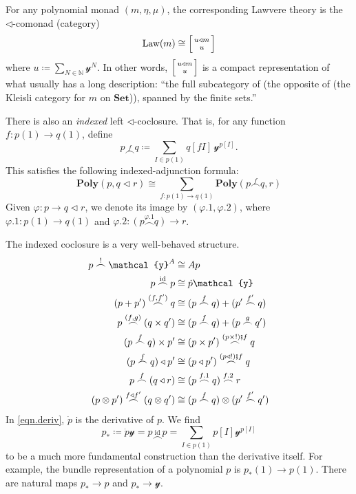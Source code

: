 \documentclass[11pt, one side, article]{memoir}
\makeatletter
\theoremstyle{definition}
\theoremstyle{plain}
\newcommand{\Cat}[1]{\mathbf{#1}}%
\newcommand{\id}{\mathrm{id}}
\newcommand{\then}{\mathbin{\fatsemi}}
\newcommand{\nn}{\mathbb{N}}
\newcommand{\smset}{\Cat{Set}}
\newcommand{\yon}{\mathcal{y}}
\newcommand{\poly}{\Cat{Poly}}
\newcommand{\0}{\textsf{0}}
\newcommand{\1}{\tn{\textsf{1}}}
\newcommand{\tri}{\mathbin{\triangleleft}}
\newcommand{\bigcocl}[2]{
     \begin{bmatrix}{\vphantom{f_f^f}#2} \\ {\vphantom{f_f^f}#1} \end{bmatrix}
}
\newcommand{\littlecocl}[2]{
     \begin{bsmallmatrix}{\vphantom{f}#2} \\ {\vphantom{f}#1} \end{bsmallmatrix}
}
\newcommand{\cocr}[2]{
  \relax\if@display
     \bigcocl{#1}{#2}
  \else
     \littlecocl{#1}{#2}
  \fi
}
\newcommand{\cocl}[1]{\overset{#1}{\frown}}
\makeatother
\begin{document}
For any polynomial monad $(m,\eta,\mu)$, the corresponding Lawvere theory is the $\tri$-comonad (category)
\begin{equation}
	\text{Law}(m)\cong\cocr{u}{u\tri m}
\end{equation}
where $u\coloneqq\sum_{N\in\nn}\yon^N$. In other words, $\cocr{u}{u\tri m}$ is a compact representation of what usually has a long description: ``the full subcategory of (the opposite of (the Kleisli category for $m$ on $\smset$)), spanned by the finite sets.''

There is also an \emph{indexed} left $\tri$-coclosure. That is, for any function $f\colon p(1)\to q(1)$, define
\begin{equation}
	p\cocl{f}q\coloneqq \sum_{I\in p(1)}q[fI]\,\yon^{p[I]}.
\end{equation}
This satisfies the following indexed-adjunction formula:
\begin{equation}
	\poly(p,q\tri r)\cong\sum_{f\colon p(1)\to q(1)}\poly(p\cocl{f}q,r)
\end{equation}
Given $\varphi\colon p\to q\tri r$, we denote its image by $(\varphi.1,\varphi.2)$, where $\varphi.1\colon p(1)\to q(1)$ and $\varphi.2\colon (p\cocl{\varphi.1}q)\to r$.

The indexed coclosure is a very well-behaved structure.
\begin{align}
	p\cocl{!}\yon^A&\cong Ap\\
	p\cocl{\id}p&\cong\dot{p}\yon\label{eqn.deriv}\\
	(p+p')\cocl{(f,f')}q&\cong(p\cocl{f}q)+(p'\cocl{f'}q)\\
	p\cocl{(f,g)}(q\times q')&\cong(p\cocl{f}q)+(p\cocl{g}q')\\
	(p\cocl{f}q)\times p'&\cong(p\times p')\cocl{(p\times!)\then f}q\\
	(p\cocl{f}q)\tri p'&\cong(p\tri p')\cocl{(p\tri!)\then f}q\\
	p\cocl{f}(q\tri r)&\cong(p\cocl{f.1}q)\cocl{f.2}r\\
	(p\otimes p')\cocl{f\tri f'}(q\otimes q')&\cong(p\cocl{f}q)\otimes(p'\cocl{f'}q')\\
\end{align}
In \eqref{eqn.deriv}, $\dot{p}$ is the derivative of $p$. We find
\begin{equation}
p_*\coloneqq\dot{p}\yon=p\cocl{\id}p=\sum_{I\in p(1)}p[I]\yon^{p[I]}
\end{equation}
to be a much more fundamental construction than the derivative itself. For example, the bundle representation of a polynomial $p$ is $p_*(1)\to p(1)$. There are natural maps $p_*\to p$ and $p_*\to\yon$.
\end{document}
